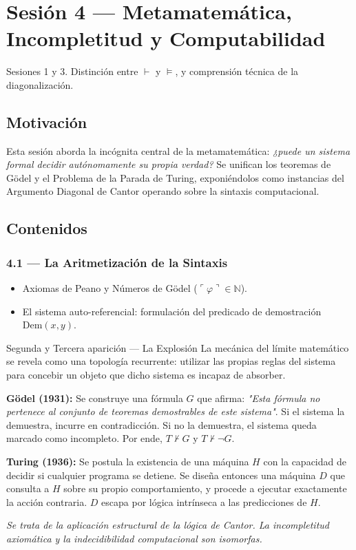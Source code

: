 \documentclass[11pt, letterpaper]{article}
\begin{document}
\section{Sesi\'on 4 --- Metamatem\'atica, Incompletitud y Computabilidad}

\begin{prereqs}
Sesiones 1 y 3. Distinci\'on entre $\vdash$ y $\models$, y comprensi\'on t\'ecnica de la diagonalizaci\'on.
\end{prereqs}

\subsection*{Motivaci\'on}
Esta sesi\'on aborda la inc\'ognita central de la metamatem\'atica: \emph{¿puede un sistema formal decidir aut\'onomamente su propia verdad?} Se unifican los teoremas de G\"odel y el Problema de la Parada de Turing, exponi\'endolos como instancias del Argumento Diagonal de Cantor operando sobre la sintaxis computacional.

\subsection{Contenidos}

\subsubsection{4.1 --- La Aritmetizaci\'on de la Sintaxis}
\begin{itemize}
  \item Axiomas de Peano y N\'umeros de G\"odel ($\ulcorner\varphi\urcorner\in\mathbb{N}$).
  \item El sistema auto-referencial: formulaci\'on del predicado de demostraci\'on $\text{Dem}(x,y)$.
\end{itemize}

\begin{diagonal}{Segunda y Tercera aparici\'on --- La Explosi\'on}
La mec\'anica del l\'imite matem\'atico se revela como una topolog\'ia recurrente: utilizar las propias reglas del sistema para concebir un objeto que dicho sistema es incapaz de absorber.

\textbf{G\"odel (1931):} Se construye una f\'ormula $G$ que afirma: \textit{"Esta f\'ormula no pertenece al conjunto de teoremas demostrables de este sistema"}. Si el sistema la demuestra, incurre en contradicci\'on. Si no la demuestra, el sistema queda marcado como incompleto. Por ende, $T \not\vdash G$ y $T \not\vdash \neg G$.

\textbf{Turing (1936):} Se postula la existencia de una m\'aquina $H$ con la capacidad de decidir si cualquier programa se detiene. Se dise\~na entonces una m\'aquina $D$ que consulta a $H$ sobre su propio comportamiento, y procede a ejecutar exactamente la acci\'on contraria. $D$ escapa por l\'ogica intr\'inseca a las predicciones de $H$.

\medskip
\textit{Se trata de la aplicaci\'on estructural de la l\'ogica de Cantor. La incompletitud axiom\'atica y la indecidibilidad computacional son isomorfas.}
\end{diagonal}
\end{document}
